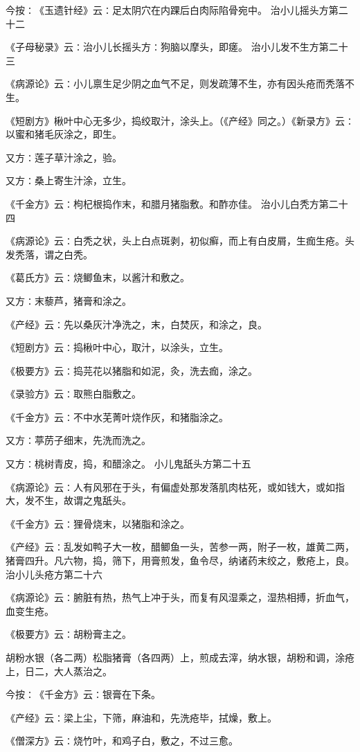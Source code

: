 \documentclass[a4paper,12pt,UTF8,twoside]{ctexbook}
\begin{document}
今按∶《玉遗针经》云∶足太阴穴在内踝后白肉际陷骨宛中。
治小儿摇头方第二十二

《子母秘录》云∶治小儿长摇头方∶狗脑以摩头，即瘥。
治小儿发不生方第二十三

《病源论》云∶小儿禀生足少阴之血气不足，则发疏薄不生，亦有因头疮而秃落不生。

《短剧方》楸叶中心无多少，捣绞取汁，涂头上。（《产经》同之。）《新录方》云∶以蜜和猪毛灰涂之，即生。

又方∶莲子草汁涂之，验。

又方∶桑上寄生汁涂，立生。

《千金方》云∶枸杞根捣作末，和腊月猪脂敷。和酢亦佳。
治小儿白秃方第二十四

《病源论》云∶白秃之状，头上白点斑剥，初似癣，而上有白皮屑，生痂生疮。头发秃落，谓之白秃。

《葛氏方》云∶烧鲫鱼末，以酱汁和敷之。

又方∶末藜芦，猪膏和涂之。

《产经》云∶先以桑灰汁净洗之，末，白焚灰，和涂之，良。

《短剧方》云∶捣楸叶中心，取汁，以涂头，立生。

《极要方》云∶捣芫花以猪脂和如泥，灸，洗去痂，涂之。

《录验方》云∶取熊白脂敷之。

《千金方》云∶不中水芜菁叶烧作灰，和猪脂涂之。

又方∶葶苈子细末，先洗而洗之。

又方∶桃树青皮，捣，和醋涂之。
小儿鬼舐头方第二十五

《病源论》云∶人有风邪在于头，有偏虚处那发落肌肉枯死，或如钱大，或如指大，发不生，故谓之鬼舐头。

《千金方》云∶狸骨烧末，以猪脂和涂之。

《产经》云∶乱发如鸭子大一枚，醋鲫鱼一头，苦参一两，附子一枚，雄黄二两，猪膏四升。凡六物，捣，筛下，用膏煎发，鱼令尽，纳诸药末绞之，敷疮上，良。
治小儿头疮方第二十六

《病源论》云∶腑脏有热，热气上冲于头，而复有风湿乘之，湿热相搏，折血气，血变生疮。

《极要方》云∶胡粉膏主之。

胡粉水银（各二两）松脂猪膏（各四两）上，煎成去滓，纳水银，胡粉和调，涂疮上，日二，大人蒸治之。

今按∶《千金方》云∶银膏在下条。

《产经》云∶梁上尘，下筛，麻油和，先洗疮毕，拭燥，敷上。

《僧深方》云∶烧竹叶，和鸡子白，敷之，不过三愈。
\end{document}
